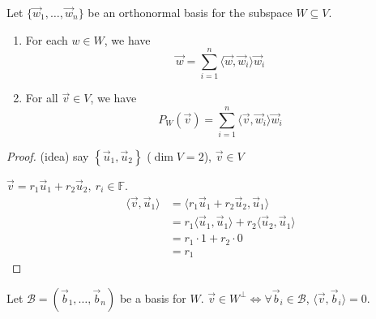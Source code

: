 \documentclass[11pt,fleqn]{book} %
\begin{document}
\begin{proposition}
    Let $\{ \vec{w}_1, \dots, \vec{w}_n \}$ be an orthonormal basis for the subspace $W \subseteq V$.

    \begin{enumerate}[label=\alph*)]
        \item For each $w \in W$, we have $$\vec{w} = \sum_{i=1}^n \langle \vec{w}, \vec{w}_i \rangle \vec{w}_i$$
        \item For all $\vec{v} \in V$, we have $$P_W(\vec{v}) = \sum_{i=1}^n \langle \vec{v}, \vec{w}_i \rangle \vec{w}_i$$
    \end{enumerate}
\end{proposition}
\setcounter{chapter}{3}

\begin{proof}
    (idea) say $\left\{ \vec{u}_1, \vec{u}_2 \right\}$ ($\dim V = 2$), $\vec{v} \in V$

    $\vec{v} = r_1\vec{u}_1 + r_2\vec{u}_2,~ r_i \in \mathbb{F}$.
    \begin{align*}
        \langle \vec{v}, \vec{u}_1 \rangle
        &= \langle r_1\vec{u}_1 + r_2\vec{u}_2, \vec{u}_1 \rangle
        \\
        &= r_1\langle \vec{u}_1, \vec{u}_1 \rangle + r_2 \langle \vec{u}_2, \vec{u}_1 \rangle
        \\
        &= r_1 \cdot 1 + r_2 \cdot 0
        \\
        &= r_1
    \end{align*}
\end{proof}

\setcounter{section}{0}
\setcounter{dummy}{5}
\begin{lemma}
    Let $\mathcal{B} = (\vec{b}_1, \dots, \vec{b}_n)$ be a basis for $W$. $\vec{v} \in W^\perp \iff \forall \vec{b}_i \in \mathcal{B}$, $\langle \vec{v}, \vec{b}_i \rangle = 0$.
\end{lemma}
\setcounter{section}{4}
\end{document}
